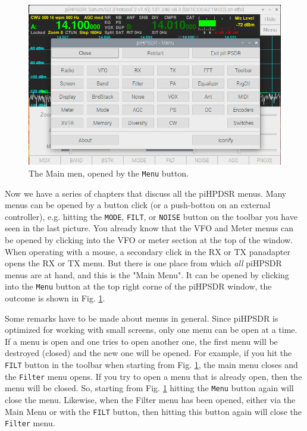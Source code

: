 \documentclass[12pt]{book}
\def\rett#1{\texttt{\color{red}#1}}
\def\bltt#1{\texttt{\color{blue}#1}}
\begin{document}
\begin{figure}[ht]
\center
\includegraphics[width=12cm]{MainMenu.png}
\caption{The Main men, opened by the \rett{Menu} button.}
\label{fig:MainMenu}
\end{figure}

Now we have a series of chapters that discuss all the piHPDSR menus. Many menus can be
opened by a button click (or a push-botton on an external controller), e.g. hitting the
 \rett{MODE}, \rett{FILT}, or \rett{NOISE} button on the
toolbar you have seen in the last picture. You already know that the VFO and Meter
menus can be opened by clicking into the VFO or meter section at the top of the window.
When operating with a mouse, a secondary click in the RX or TX panadapter opens the
RX or TX menu. But there is one place from which \textit{all} piHPSDR menus are at hand,
and this is the "Main Menu". It can be opened by clicking into the \rett{Menu} button at the
top right corne of the piHPSDR window, the outcome is shown in Fig. \ref{fig:MainMenu}.

Some remarks have to be made about menus in general. Since piHPSDR is optimized for
working with small screens, only one menu can be open at a time. If a menu is open
and one tries to open another one, the first menu will be destroyed (closed) and the
new one will be opened. For example, if you hit the \rett{FILT} button in the toolbar
when starting from Fig. \ref{fig:MainMenu}, the main menu closes and the \bltt{Filter} menu
opens. If you try to open a menu that is already open, then the menu will be closed.
So, starting from Fig. \ref{fig:MainMenu} hitting the \rett{Menu} button again will close
the menu. Likewise, when the Filter menu has been opened, either via the Main Menu
or with the \rett{FILT} button, then hitting this button again will close the
\bltt{Filter} menu.
\end{document}
